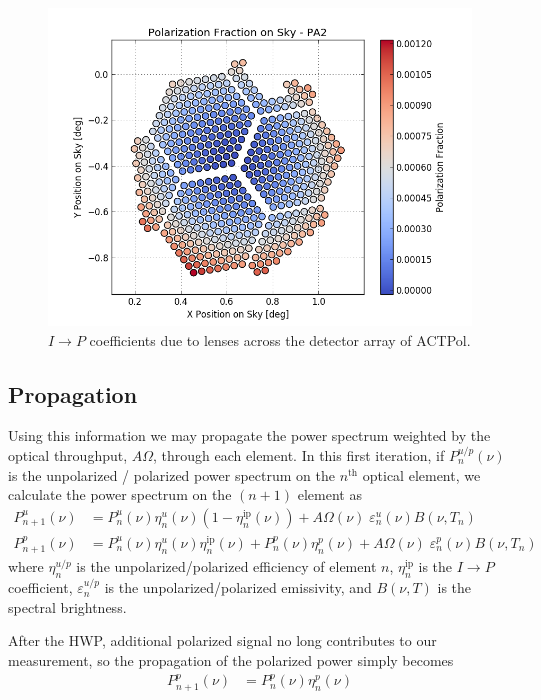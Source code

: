 \documentclass{article}
\theoremstyle{remark}
\newcommand{\tab}{\hspace*{2em}}
\renewcommand{\t}[1]{\text{#1}}
\newcommand{\ip}{$I\rightarrow P$ }
\begin{document}
\begin{figure}[t!]
	\centering
  \includegraphics[width=.8\linewidth]{images/pa2_polarization_fraction.png}
  \caption{$I\rightarrow P$ coefficients due to lenses across the detector array of ACTPol.}
  \label{fig:IP-array}
\end{figure}

\subsection*{Propagation}
\tab Using this information we may propagate the power spectrum weighted by the optical throughput, $A\Omega$, through each element.
In this first iteration, if $P_{n}^{u/p}(\nu)$ is the unpolarized / polarized power spectrum on the $n^\t{th}$ optical element, 
we calculate the power spectrum on the $(n+1)$ element as
\begin{align}
P_{n+1}^u(\nu) &= P_n^u(\nu) \eta_n^u(\nu) (1 - \eta_n^{\t{ip}}(\nu)) + A\Omega(\nu) \; \varepsilon_n^u(\nu) B(\nu,T_n)\\
P_{n+1}^p(\nu) &= P_n^u(\nu) \eta_n^u(\nu) \eta_n^{\t{ip}}(\nu) +  P_n^p(\nu) \eta_n^p(\nu) + A\Omega(\nu) \; \varepsilon_n^p(\nu) B(\nu,T_n)
\end{align}
where $\eta_n^{u/p}$ is the unpolarized/polarized efficiency of element $n$, $\eta_n^\t{ip}$ is the \ip coefficient, $\varepsilon_n^{u/p}$
is the unpolarized/polarized emissivity, and $B(\nu,T)$ is the spectral brightness.

\tab After the HWP, additional polarized signal no long contributes to our measurement, 
so the propagation of the polarized power simply becomes
\begin{align}
P_{n+1}^p(\nu) &=  P_n^p(\nu) \eta_n^p(\nu) 
\end{align}
\end{document}
